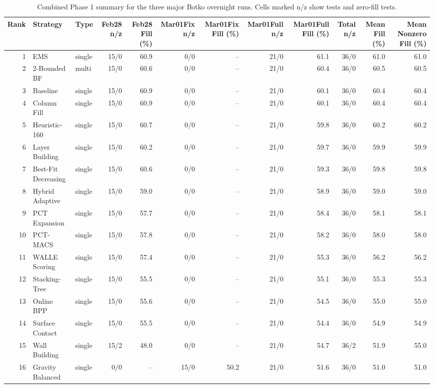 \begin{table}[htbp]
\centering
\caption{Combined Phase 1 summary for the three major Botko overnight runs. Cells marked n/z show tests and zero-fill tests.}
\label{tab:botko-last-three-runs}
\small
\setlength{\tabcolsep}{4pt}
\begin{tabular}{rllrrrrrrrrr}
\toprule
Rank & Strategy & Type & Feb28 n/z & Feb28 Fill (\%) & Mar01Fix n/z & Mar01Fix Fill (\%) & Mar01Full n/z & Mar01Full Fill (\%) & Total n/z & Mean Fill (\%) & Mean Nonzero Fill (\%) \\
\midrule
1 & EMS & single & 15/0 & 60.9 & 0/0 & -- & 21/0 & 61.1 & 36/0 & 61.0 & 61.0 \\
2 & 2-Bounded BF & multi & 15/0 & 60.6 & 0/0 & -- & 21/0 & 60.4 & 36/0 & 60.5 & 60.5 \\
3 & Baseline & single & 15/0 & 60.9 & 0/0 & -- & 21/0 & 60.1 & 36/0 & 60.4 & 60.4 \\
4 & Column Fill & single & 15/0 & 60.9 & 0/0 & -- & 21/0 & 60.1 & 36/0 & 60.4 & 60.4 \\
5 & Heuristic-160 & single & 15/0 & 60.7 & 0/0 & -- & 21/0 & 59.8 & 36/0 & 60.2 & 60.2 \\
6 & Layer Building & single & 15/0 & 60.2 & 0/0 & -- & 21/0 & 59.7 & 36/0 & 59.9 & 59.9 \\
7 & Best-Fit Decreasing & single & 15/0 & 60.6 & 0/0 & -- & 21/0 & 59.3 & 36/0 & 59.8 & 59.8 \\
8 & Hybrid Adaptive & single & 15/0 & 59.0 & 0/0 & -- & 21/0 & 58.9 & 36/0 & 59.0 & 59.0 \\
9 & PCT Expansion & single & 15/0 & 57.7 & 0/0 & -- & 21/0 & 58.4 & 36/0 & 58.1 & 58.1 \\
10 & PCT-MACS & single & 15/0 & 57.8 & 0/0 & -- & 21/0 & 58.2 & 36/0 & 58.0 & 58.0 \\
11 & WALLE Scoring & single & 15/0 & 57.4 & 0/0 & -- & 21/0 & 55.3 & 36/0 & 56.2 & 56.2 \\
12 & Stacking-Tree & single & 15/0 & 55.5 & 0/0 & -- & 21/0 & 55.1 & 36/0 & 55.3 & 55.3 \\
13 & Online BPP & single & 15/0 & 55.6 & 0/0 & -- & 21/0 & 54.5 & 36/0 & 55.0 & 55.0 \\
14 & Surface Contact & single & 15/0 & 55.5 & 0/0 & -- & 21/0 & 54.4 & 36/0 & 54.9 & 54.9 \\
15 & Wall Building & single & 15/2 & 48.0 & 0/0 & -- & 21/0 & 54.7 & 36/2 & 51.9 & 55.0 \\
16 & Gravity Balanced & single & 0/0 & -- & 15/0 & 50.2 & 21/0 & 51.6 & 36/0 & 51.0 & 51.0 \\

\end{tabular}
\end{table}
